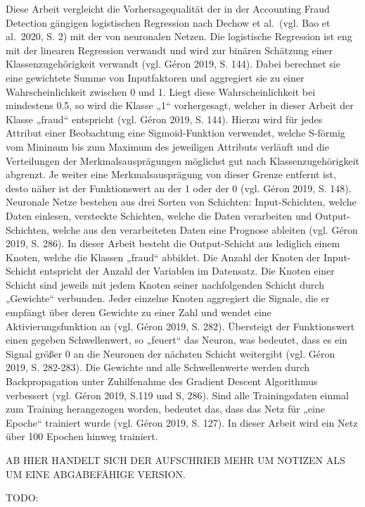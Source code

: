 \documentclass[a4paper, nobind]{templates/ociamthesis}
\begin{document}
Diese Arbeit vergleicht die Vorhersagequalität der in der Accounting Fraud Detection gängigen logistischen Regression nach Dechow et al.~(vgl. Bao et al.~2020, S. 2) mit der von neuronalen Netzen.
Die logistische Regression ist eng mit der linearen Regression verwandt und wird zur binären Schätzung einer Klassenzugehörigkeit verwandt (vgl. Géron 2019, S. 144). Dabei berechnet sie eine gewichtete Summe von Inputfaktoren und aggregiert sie zu einer Wahrscheinlichkeit zwischen 0 und 1. Liegt diese Wahrscheinlichkeit bei mindestens 0.5, so wird die Klasse „1`` vorhergesagt, welcher in dieser Arbeit der Klasse „fraud`` entspricht (vgl. Géron 2019, S. 144). Hierzu wird für jedes Attribut einer Beobachtung eine Sigmoid-Funktion verwendet, welche S-förmig vom Minimum bis zum Maximum des jeweiligen Attributs verläuft und die Verteilungen der Merkmalsausprägungen möglichst gut nach Klassenzugehörigkeit abgrenzt. Je weiter eine Merkmalsausprägung von dieser Grenze entfernt ist, desto näher ist der Funktionswert an der 1 oder der 0 (vgl. Géron 2019, S. 148).
Neuronale Netze bestehen aus drei Sorten von Schichten: Input-Schichten, welche Daten einlesen, versteckte Schichten, welche die Daten verarbeiten und Output-Schichten, welche aus den verarbeiteten Daten eine Prognose ableiten (vgl. Géron 2019, S. 286). In dieser Arbeit besteht die Output-Schicht aus lediglich einem Knoten, welche die Klassen „fraud`` abbildet. Die Anzahl der Knoten der Input-Schicht entspricht der Anzahl der Variablen im Datensatz. Die Knoten einer Schicht sind jeweils mit jedem Knoten seiner nachfolgenden Schicht durch „Gewichte`` verbunden. Jeder einzelne Knoten aggregiert die Signale, die er empfängt über deren Gewichte zu einer Zahl und wendet eine Aktivierungsfunktion an (vgl. Géron 2019, S. 282). Übersteigt der Funktionswert einen gegeben Schwellenwert, so „feuert`` das Neuron, was bedeutet, dass es ein Signal größer 0 an die Neuronen der nächsten Schicht weitergibt (vgl. Géron 2019, S. 282-283). Die Gewichte und alle Schwellenwerte werden durch Backpropagation unter Zuhilfenahme des Gradient Descent Algorithmus verbessert (vgl. Géron 2019, S.119 und S, 286). Sind alle Trainingsdaten einmal zum Training herangezogen worden, bedeutet das, dass das Netz für „eine Epoche`` trainiert wurde (vgl. Géron 2019, S. 127). In dieser Arbeit wird ein Netz über 100 Epochen hinweg trainiert.

AB HIER HANDELT SICH DER AUFSCHRIEB MEHR UM NOTIZEN ALS UM EINE ABGABEFÄHIGE VERSION.

TODO:
\end{document}
